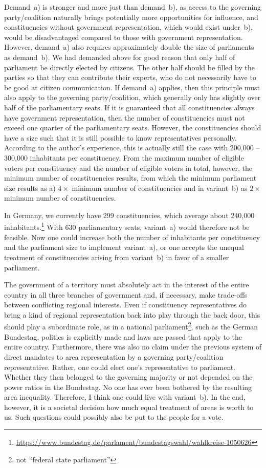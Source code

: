 Demand~a) is stronger and more just than demand~b), as access to the
governing party/coalition naturally brings potentially more opportunities for influence, and
constituencies without government representation, which would exist under~b), would be
disadvantaged compared to those with government representation. However, demand~a) also requires approximately double the
size of parliaments as demand~b).
We had demanded above for good reason that only half of parliament be directly
elected by citizens. The other half should be filled by the parties so that they can
contribute their experts, who do not necessarily have to be good at citizen communication. If
demand~a) applies, then this principle must also apply to the governing party/coalition,
which generally only has slightly over half of the parliamentary seats. If it is guaranteed that all
constituencies always have government representation, then the number of constituencies must not
exceed one quarter of the parliamentary seats. However, the constituencies should have a size
such that it is still possible to know representatives personally. According to the author's
experience, this is actually still the case with 200,000 -- 300,000 inhabitants per constituency.
From the maximum number of eligible voters per constituency and the number of
eligible voters in total, however, the minimum number of constituencies results, from which
the minimum parliament size results as a) $4\times$ minimum number of constituencies and in
variant~b) as $2\times$ minimum number of constituencies.

In Germany, we currently have 299 constituencies, which average about 240,000 inhabitants.\footnote{\url{https://www.bundestag.de/parlament/bundestagswahl/wahlkreise-1050626}} With
630 parliamentary seats, variant~a) would therefore not be feasible. Now one could increase both the
number of inhabitants per constituency and the parliament size to implement variant~a),
or one accepts the unequal treatment of constituencies arising from variant~b)
in favor of a smaller parliament.

The government of a territory must absolutely act in the interest of the entire
country in all three branches of government and, if necessary, make trade-offs between conflicting regional interests.
Even if constituency representatives do bring a kind of regional representation back into play through the back door,
this should play a subordinate role, as
in a national parliament\footnote{not \enquote{federal state parliament}}, such as the German
Bundestag, politics is explicitly made and laws are passed that apply to the entire country.
Furthermore, there was also no claim under the previous system of direct mandates
to area representation by a governing party/coalition representative. Rather, one could
elect one's representative to parliament. Whether they then belonged to the governing majority or not
depended on the power ratios in the Bundestag. No one has ever been bothered by the resulting
area inequality. Therefore, I think one could live with variant~b).
In the end, however, it is a societal decision how much equal treatment
of areas is worth to us. Such questions could possibly also be put to the people for a vote.

